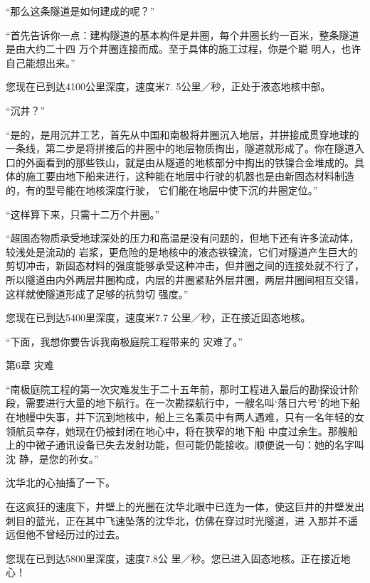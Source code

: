 \documentclass{article}
\begin{document}
“那么这条隧道是如何建成的呢？” 

“首先告诉你一点：建构隧道的基本构件是井圈，每个井圈长约一百米，整条隧道是由大约二十四
\newpage
万个井圈连接而成。至于具体的施工过程，你是个聪
明人，也许自己能想出来。” 

您现在已到达4100公里深度，速度米7.
5公里／秒，正处于液态地核中部。 


“沉井？” 

“是的，是用沉井工艺，首先从中国和南极将井圈沉入地层，并拼接成贯穿地球的一条线，第二步是将拼接后的井圈中的地层物质掏出，隧道就形成了。你在隧道入口的外面看到的那些铁山，就是由从隧道的地核部分中掏出的铁镍合金堆成的。具体的施工要由地下船来进行，这种能在地层中行驶的机器也是由新固态材料制造的，有的型号能在地核深度行驶，
它们能在地层中使下沉的井圈定位。” 


“这样算下来，只需十二万个井圈。” 

“超固态物质承受地球深处的压力和高温是没有问题的，但地下还有许多流动体，较浅处是流动的
\newpage
岩浆，更危险的是地核中的液态铁镍流，它们对隧道产生巨大的剪切冲击，新固态材料的强度能够承受这种冲击，但井圈之间的连接处就不行了，所以隧道由内外两层井圈构成，内层的井圈紧贴外层井圈，两层井圈间相互交错，这样就使隧道形成了足够的抗剪切
强度。” 

您现在已到达5400里深度，速度米7.7
公里／秒，正在接近固态地核。 

“下面，我想你要告诉我南极庭院工程带来的
灾难了。” 


第6章 灾难 

“南极庭院工程的第一次灾难发生于二十五年前，那时工程进入最后的勘探设计阶段，需要进行大量的地下航行。在一次勘探航行中，一艘名叫‘落日六号’的地下船在地幔中失事，并下沉到地核中，船上三名乘员中有两人遇难，只有一名年轻的女领航员幸存，她现在仍被封闭在地心中，将在狭窄的地下船
\newpage
中度过余生。那艘船上的中微子通讯设备已失去发射功能，但可能仍能接收。顺便说一句：她的名字叫沈
静，是您的孙女。” 


沈华北的心抽搐了一下。 

在这疯狂的速度下，井壁上的光圈在沈华北眼中已连为一体，使这巨井的井壁发出刺目的蓝光，正在其中飞速坠落的沈华北，仿佛在穿过时光隧道，进
入那并不遥远但他不曾经历过的过去。 

您现在已到达5800里深度，速度7.8公
里／秒。您已进入固态地核。正在接近地心！ 
\end{document}
